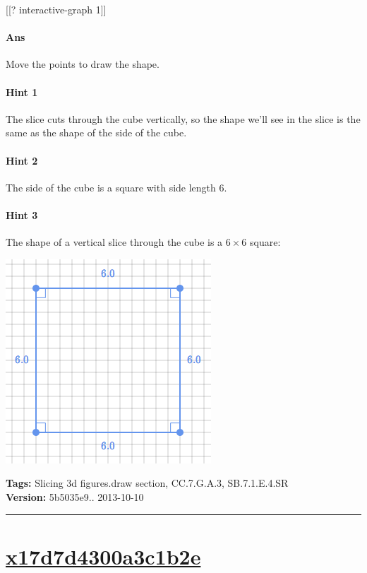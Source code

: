 \documentclass[twocolumn,10pt]{article}
\def\shrinkfactor{0.4}
\begin{document}
[[? interactive-graph 1]] 


\paragraph{Ans} Move the points to draw the shape. 

\paragraph{Hint 1}The slice cuts through the cube vertically, so the shape we'll see in the slice is the same as the shape of the side of the cube.

\paragraph{Hint 2}The side of the cube is a square with side length $6$.

\paragraph{Hint 3}The shape of a vertical slice through the cube is a $6 \times 6$ square:   

\includegraphics[scale=\shrinkfactor]{figures/17941d59a646cbfd163d76d74fb932b7b62b27c8.png}



\medskip
\noindent
\textbf{Tags:} {\footnotesize Slicing 3d figures.draw section, CC.7.G.A.3, SB.7.1.E.4.SR}\\
\textbf{Version:} 5b5035e9.. 2013-10-10
\smallskip\hrule





\section{\href{https://www.khanacademy.org/devadmin/content/items/x17d7d4300a3c1b2e}{x17d7d4300a3c1b2e}}
\end{document}
